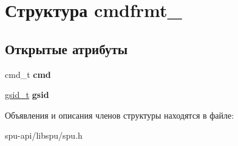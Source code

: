 \hypertarget{structcmdfrmt__3}{}\section{Структура cmdfrmt\+\_}
\label{structcmdfrmt__3}
\subsection*{Открытые атрибуты}
\begin{DoxyCompactItemize}
\item 
\mbox{\label{structcmdfrmt__3_a5a0e501af05e7bd2bb43c8f45861a530}} 
cmd\+\_\+t {\bfseries cmd}
\item 
\mbox{\label{structcmdfrmt__3_aa63e0da586acab5b66f0e64e32003b83}} 
\hyperlink{structgsid__container}{gsid\+\_\+t} {\bfseries gsid}
\end{DoxyCompactItemize}


Объявления и описания членов структуры находятся в файле\+:\begin{DoxyCompactItemize}
\item 
spu-\/api/libspu/spu.\+h\end{DoxyCompactItemize}

